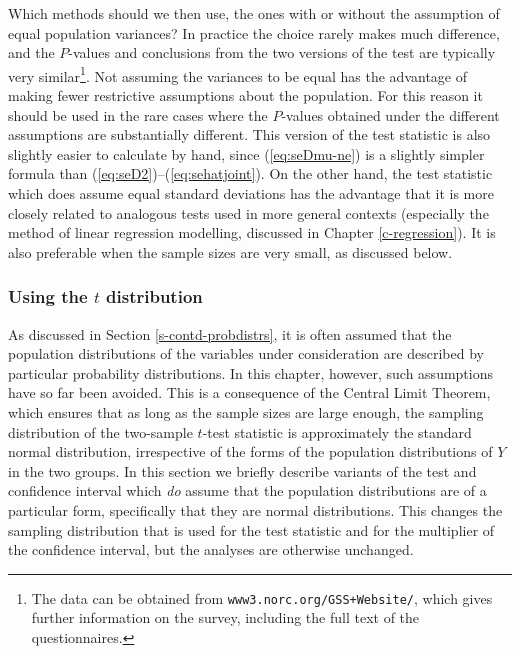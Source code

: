 \documentclass[11pt,a4paper,openany]{book}
\let\rmarkdownfootnote\footnote%
\def\footnote{\protect\rmarkdownfootnote}
\begin{document}
Which methods should we then use, the ones with or without the
assumption of equal population variances? In practice the choice rarely
makes much difference, and the \(P\)-values and conclusions from the two
versions of the test are typically very similar\footnote{The data can be
  obtained from \texttt{www3.norc.org/GSS+Website/}, which gives further
  information on the survey, including the full text of the
  questionnaires.}. Not assuming the variances to be equal has the
advantage of making fewer restrictive assumptions about the population.
For this reason it should be used in the rare cases where the
\(P\)-values obtained under the different assumptions are substantially
different. This version of the test statistic is also slightly easier to
calculate by hand, since (\ref{eq:seDmu-ne}) is a slightly simpler
formula than (\ref{eq:seD2})--(\ref{eq:sehatjoint}). On the other hand,
the test statistic which does assume equal standard deviations has the
advantage that it is more closely related to analogous tests used in
more general contexts (especially the method of linear regression
modelling, discussed in Chapter \ref{c-regression}). It is also
preferable when the sample sizes are very small, as discussed below.

\subsubsection*{\texorpdfstring{Using the \(t\)
distribution}{Using the t distribution}}\label{using-the-t-distribution}

As discussed in Section \ref{s-contd-probdistrs}, it is often assumed
that the population distributions of the variables under consideration
are described by particular probability distributions. In this chapter,
however, such assumptions have so far been avoided. This is a
consequence of the Central Limit Theorem, which ensures that as long as
the sample sizes are large enough, the sampling distribution of the
two-sample \(t\)-test statistic is approximately the standard normal
distribution, irrespective of the forms of the population distributions
of \(Y\) in the two groups. In this section we briefly describe variants
of the test and confidence interval which \emph{do} assume that the
population distributions are of a particular form, specifically that
they are normal distributions. This changes the sampling distribution
that is used for the test statistic and for the multiplier of the
confidence interval, but the analyses are otherwise unchanged.
\end{document}
